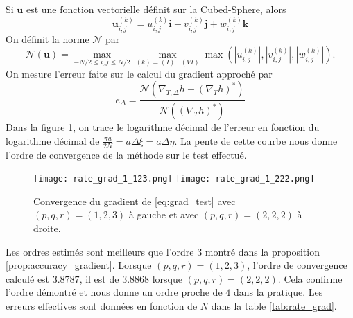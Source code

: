 Si $\mathbf{u}$ est une fonction vectorielle définit sur la Cubed-Sphere, alors
\begin{equation}
\mathbf{u}_{i,j}^{(k)} = u_{i,j}^{(k)} \mathbf{i} + v_{i,j}^{(k)} \mathbf{j} + w_{i,j}^{(k)} \mathbf{k}
\end{equation}
On définit la norme $\mathcal{N}$ par
\begin{equation}
\mathcal{N}(\mathbf{u}) = \max_{-N/2 \leq i,j \leq N/2} \max_{(k) = (I) \ldots (VI)} \max (|u_{i,j}^{(k)}|, |v_{i,j}^{(k)}|, |w_{i,j}^{(k)}|).
\end{equation}
On mesure l'erreur faite sur le calcul du gradient approché par
\begin{equation}
e_{\Delta} = \dfrac{\mathcal{N}\left(\nabla_{T,\Delta}h - \left( \nabla_{T}h \right)^* \right)}{\mathcal{N}\left(\left( \nabla_{T}h \right)^* \right)}
\end{equation}
Dans la figure \ref{fig:rate_grad}, on trace le logarithme décimal de l'erreur en fonction du logarithme décimal de $\frac{\pi a}{2 N} = a \Delta \xi = a \Delta \eta$. La pente de cette courbe nous donne l'ordre de convergence de la méthode sur le test effectué.

\begin{figure}[htbp]
\begin{center}
\texttt{[image: rate\_grad\_1\_123.png]}
\texttt{[image: rate\_grad\_1\_222.png]}
\end{center}
\caption{Convergence du gradient de \eqref{eq:grad_test} avec $(p,q,r)=(1,2,3)$ à gauche et avec $(p,q,r)=(2,2,2)$ à droite.}
\label{fig:rate_grad}
\end{figure}

Les ordres estimés sont meilleurs que l'ordre 3 montré dans la proposition \ref{prop:accuracy_gradient}. Lorsque $(p,q,r)=(1,2,3)$, l'ordre de convergence calculé est $3.8787$, il est de $3.8868$ lorsque $(p,q,r)=(2,2,2)$. Cela confirme l'ordre démontré et nous donne un ordre proche de $4$ dans la pratique. Les erreurs effectives sont données en fonction de $N$ dans la table \ref{tab:rate_grad}.

